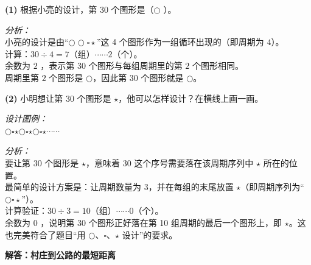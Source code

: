 \documentclass[12pt, a4paper]{ctexart}
\begin{document}
{\small
\textbf{(1)} 根据小亮的设计，第 30 个图形是（\quad \textbf{$\bigcirc$} \quad）。

\vspace{0.3cm}
\textit{分析：}\\
小亮的设计是由“$\bigcirc \bigcirc \square \star$”这 4 个图形作为一组循环出现的（即周期为 $4$）。\\
计算：$30 \div 4 = 7$（组）$\cdots\cdots 2$（个）。\\
余数为 $2$ ，表示第 $30$ 个图形与每组周期里的第 $2$ 个图形相同。\\
周期里第 $2$ 个图形是 $\bigcirc$，因此第 $30$ 个图形就是 $\bigcirc$。

\vspace{0.8cm}
\textbf{(2)} 小明想让第 30 个图形是 $\star$，他可以怎样设计？在横线上画一画。

\vspace{0.3cm}
\textit{设计图例：}\\
\underline{\quad \Large $\bigcirc$\quad$\square$\quad$\star$\quad$\bigcirc$\quad$\square$\quad$\star$\quad$\bigcirc$\quad$\square$\quad$\star$\quad$\cdots\cdots$ \quad}

\vspace{0.6cm}
\textit{分析：}\\
要让第 $30$ 个图形是 $\star$，意味着 $30$ 这个序号需要落在该周期序列中 $\star$ 所在的位置。\\
最简单的设计方案是：让周期数量为 $3$，并在每组的末尾放置 $\star$（即周期序列为“$\bigcirc\square\star$”）。\\
计算验证：$30 \div 3 = 10$（组）$\cdots\cdots 0$（个）。\\
余数为 $0$ ，说明第 $30$ 个图形正好落在第 10 组周期的最后一个图形上，即 $\star$。这也完美符合了题目“用 $\bigcirc$、$\square$、$\star$ 设计”的要求。
}


\newpage

\begin{center}
  {\large\bfseries 解答：村庄到公路的最短距离}
\end{center}

\vspace{0.6cm}


\vspace{1.0cm}
\end{document}
